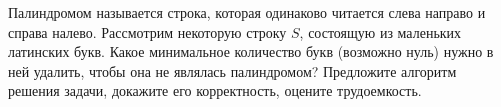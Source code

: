 \documentclass{article}
\begin{document}
Палиндромом называется строка, которая одинаково читается слева направо и справа налево. Рассмотрим некоторую строку $S$, 
состоящую из маленьких латинских букв. Какое минимальное количество букв (возможно нуль) нужно в ней удалить, чтобы она не являлась палиндромом? Предложите алгоритм решения задачи, 
докажите его корректность, оцените трудоемкость.
\end{document}
